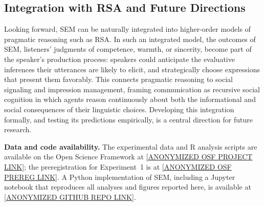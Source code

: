 \documentclass[12pt,a4paper]{article}
\begin{document}
\subsection{Integration with RSA and Future Directions}
\label{sec:rsa-int}

Looking forward, SEM can be naturally integrated into higher-order models of
pragmatic reasoning such as RSA. In such an integrated model, the outcomes of
SEM, listeners' judgments of competence, warmth, or sincerity, become part of
the speaker's production process: speakers could anticipate the evaluative
inferences their utterances are likely to elicit, and strategically choose
expressions that present them favorably. This connects pragmatic reasoning to
social signaling and impression management, framing communication as recursive
social cognition in which agents reason continuously about both the informational
and social consequences of their linguistic choices. Developing this integration
formally, and testing its predictions empirically, is a central direction for
future research.

\bigskip

\noindent\textbf{Data and code availability.}
The experimental data and R analysis scripts are available on the Open Science
Framework at \url{[ANONYMIZED OSF PROJECT LINK]}; the preregistration for
Experiment~1 is at \url{[ANONYMIZED OSF PREREG LINK]}. A Python implementation of
SEM, including a Jupyter notebook that reproduces all analyses and figures
reported here, is available at \url{[ANONYMIZED GITHUB REPO LINK]}.


\printbibliography
\end{document}
